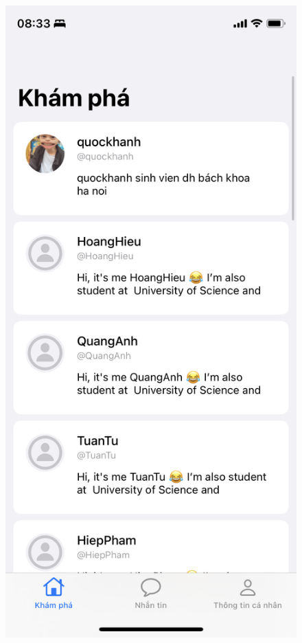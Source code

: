 \documentclass[../DoAn.tex]{subfiles}
\begin{document}
\begin{figure}[H]
\begin{minipage}{0.5\textwidth}
\includegraphics[width=0.95\linewidth]{Hinhve/Application/Explore.png}

\end{minipage}
\end{figure}
\end{document}
